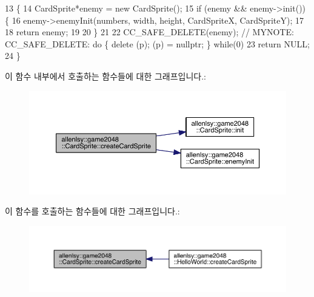 \begin{DoxyCode}
13                                                                                                            
            \{
14         CardSprite*enemy = \textcolor{keyword}{new} CardSprite();
15     \textcolor{keywordflow}{if} (enemy && enemy->init()) \{
16         enemy->enemyInit(numbers, width, height, CardSpriteX, CardSpriteY);
17 
18         \textcolor{keywordflow}{return} enemy;
19 
20     \}
21 
22     CC\_SAFE\_DELETE(enemy); \textcolor{comment}{// MYNOTE: CC\_SAFE\_DELETE: do \{ delete (p); (p) = nullptr; \} while(0)}
23     \textcolor{keywordflow}{return} NULL;
24     \}
\end{DoxyCode}
이 함수 내부에서 호출하는 함수들에 대한 그래프입니다.\+:
\nopagebreak
\begin{figure}[H]
\begin{center}
\leavevmode
\includegraphics[width=350pt]{d9/d22/classallenlsy_1_1game2048_1_1_card_sprite_a3a14745470040dfb933397ccb83344d7_cgraph}
\end{center}
\end{figure}
이 함수를 호출하는 함수들에 대한 그래프입니다.\+:
\nopagebreak
\begin{figure}[H]
\begin{center}
\leavevmode
\includegraphics[width=350pt]{d9/d22/classallenlsy_1_1game2048_1_1_card_sprite_a3a14745470040dfb933397ccb83344d7_icgraph}
\end{center}
\end{figure}
\mbox{\label{classallenlsy_1_1game2048_1_1_card_sprite_afdf6cfc4ce73b460a30791de269f7f69}} 
